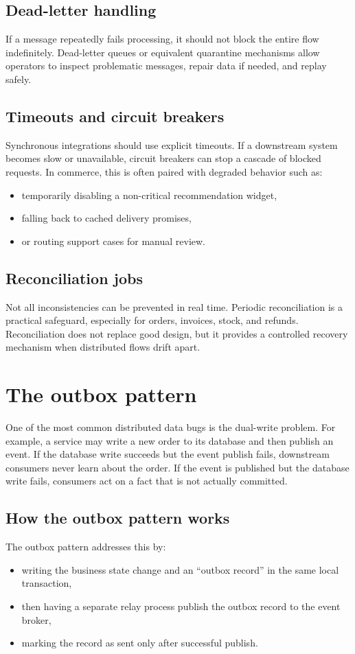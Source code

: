 \subsection{Dead-letter handling}
If a message repeatedly fails processing, it should not block the entire flow indefinitely.
Dead-letter queues or equivalent quarantine mechanisms allow operators to inspect problematic messages, repair data if needed, and replay safely.

\subsection{Timeouts and circuit breakers}
Synchronous integrations should use explicit timeouts.
If a downstream system becomes slow or unavailable, circuit breakers can stop a cascade of blocked requests.
In commerce, this is often paired with degraded behavior such as:
\begin{itemize}
  \item temporarily disabling a non-critical recommendation widget,
  \item falling back to cached delivery promises,
  \item or routing support cases for manual review.
\end{itemize}

\subsection{Reconciliation jobs}
Not all inconsistencies can be prevented in real time.
Periodic reconciliation is a practical safeguard, especially for orders, invoices, stock, and refunds.
Reconciliation does not replace good design, but it provides a controlled recovery mechanism when distributed flows drift apart.

\section{The outbox pattern}
One of the most common distributed data bugs is the dual-write problem.
For example, a service may write a new order to its database and then publish an event.
If the database write succeeds but the event publish fails, downstream consumers never learn about the order.
If the event is published but the database write fails, consumers act on a fact that is not actually committed.

\subsection{How the outbox pattern works}
The outbox pattern addresses this by:
\begin{itemize}
  \item writing the business state change and an ``outbox record'' in the same local transaction,
  \item then having a separate relay process publish the outbox record to the event broker,
  \item marking the record as sent only after successful publish.
\end{itemize}

